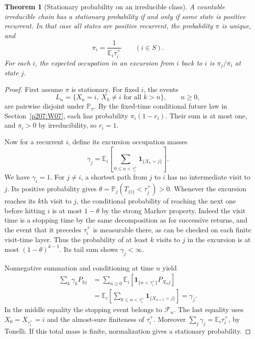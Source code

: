 \documentclass[11pt,oneside,openany]{book}
\theoremstyle{plain}
\newtheorem{theorem}{Theorem}[chapter]
\theoremstyle{definition}
\theoremstyle{remark}
\begin{document}
\begin{theorem}[Stationary probability on an irreducible class]
A countable irreducible chain has a stationary probability
if and only if some state is positive recurrent. In that case
all states are positive recurrent, the probability \(\pi\) is
unique, and
\[
 \pi_i=\frac{1}{\mathbb E_i\tau_i^+}
 \qquad(i\in S).
\]
For each \(i\), the expected occupation in an excursion from \(i\)
back to \(i\) is \(\pi_j/\pi_i\) at state \(j\).
\end{theorem}
\begin{proof}
First assume \(\pi\) is stationary. For fixed \(i\), the events
\[
 L_n=\{X_n=i,\ X_k\ne i\text{ for all }k>n\},
 \qquad n\ge0,
\]
are pairwise disjoint under \(\mathbb P_\pi\).
By the fixed-time conditional future law in Section~\ref{p207:W07},
each has probability \(\pi_i(1-r_i)\).
Their sum is at most one, and \(\pi_i>0\) by irreducibility,
so \(r_i=1\).

Now for a recurrent \(i\), define its excursion occupation masses
\[
 \gamma_j=\mathbb E_i\left[\sum_{0\le n<\tau_i^+}
                             \mathbf{1}_{\{X_n=j\}}\right].
\]
We have \(\gamma_i=1\). For \(j\ne i\), a shortest path from \(j\)
to \(i\) has no intermediate visit to \(j\). Its positive probability
gives \(\theta=\mathbb P_j(T_{\{i\}}<\tau_j^+)>0\).
Whenever the excursion reaches its \(k\)th visit to \(j\), the
conditional probability of reaching the next one before hitting \(i\)
is at most \(1-\theta\) by the strong Markov property.
Indeed the visit time is a stopping time by the same decomposition
as for successive returns, and the event that it precedes
\(\tau_i^+\) is measurable there, as can be checked on each finite
visit-time layer. Thus the probability of at least \(k\) visits
to \(j\) in the excursion is at most \((1-\theta)^{k-1}\).
Its tail sum shows \(\gamma_j<\infty\).

Nonnegative summation and conditioning at time \(n\) yield
\[
 \begin{aligned}
 \sum_{k}\gamma_kP_{kj}
 &=\sum_{n\ge0}\mathbb E_i[
       \mathbf{1}_{\{n<\tau_i^+\}}P_{X_nj}]\\
 &=\mathbb E_i\!\left[\sum_{0\le n<\tau_i^+}
                         \mathbf{1}_{\{X_{n+1}=j\}}\right]
 =\gamma_j .
 \end{aligned}
\]
In the middle equality the stopping event belongs to
\(\mathcal F_n\). The last equality uses \(X_0=X_{\tau_i^+}=i\)
and the almost-sure finiteness of \(\tau_i^+\).
Moreover \(\sum_j\gamma_j=\mathbb E_i\tau_i^+\), by Tonelli.
If this total mass is finite, normalization gives a stationary
probability.


\end{proof}
\end{document}
